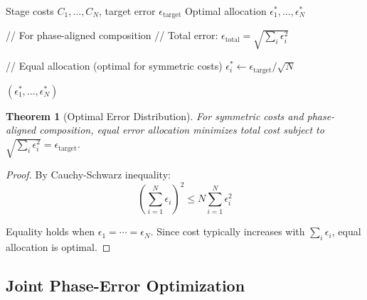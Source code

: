 \documentclass[11pt]{article}
\newtheorem{theorem}{Theorem}
\begin{document}
\begin{algorithm}
\caption{Optimal Error Allocation}
\label{alg:error_allocation}
\begin{algorithmic}[1]
\REQUIRE Stage costs $C_1, \ldots, C_N$, target error $\epsilon_{\text{target}}$
\ENSURE Optimal allocation $\epsilon_1^*, \ldots, \epsilon_N^*$

\STATE // For phase-aligned composition
\STATE // Total error: $\epsilon_{\text{total}} = \sqrt{\sum_i \epsilon_i^2}$

\STATE // Equal allocation (optimal for symmetric costs)
    \STATE $\epsilon_i^* \leftarrow \epsilon_{\text{target}} / \sqrt{N}$
\ENDFOR

\RETURN $(\epsilon_1^*, \ldots, \epsilon_N^*)$
\end{algorithmic}
\end{algorithm}

\begin{theorem}[Optimal Error Distribution]
For symmetric costs and phase-aligned composition, equal error allocation minimizes total cost subject to $\sqrt{\sum_i \epsilon_i^2} = \epsilon_{\text{target}}$.
\end{theorem}

\begin{proof}
By Cauchy-Schwarz inequality:
\begin{equation}
\left(\sum_{i=1}^N \epsilon_i\right)^2 \leq N \sum_{i=1}^N \epsilon_i^2
\end{equation}

Equality holds when $\epsilon_1 = \cdots = \epsilon_N$. Since cost typically increases with $\sum_i \epsilon_i$, equal allocation is optimal.
\end{proof}

\subsection{Joint Phase-Error Optimization}
\end{document}
